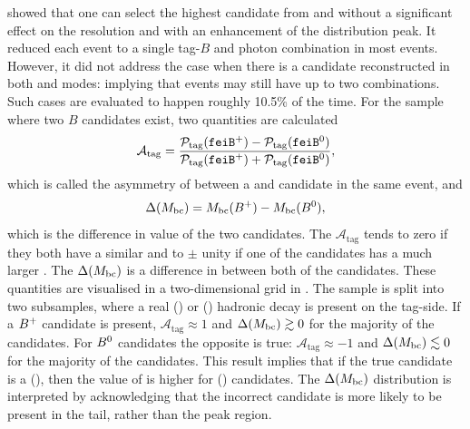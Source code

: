  showed that one can select the highest \feiProb candidate from \feiBp and \feiBz without a significant effect on the \EB resolution and with an enhancement of the \Mbc distribution peak.
It reduced each event to a single tag-$B$ and photon combination in most events.
However, it did not address the case when there is a candidate reconstructed in both \feiBp and \feiBz modes: implying that events may still have up to two combinations.
Such cases are evaluated to happen roughly 10.5\% of the time. 
For the sample where two $B$ candidates exist, two quantities are calculated
\begin{equation}\label{eq:asymmetry_tag}
    \mathcal{A}_{\mathrm{tag}} = \frac{\mathcal{P}_{\mathrm{tag}}({\texttt{feiB}^+}) - \mathcal{P}_{\mathrm{tag}}({\texttt{feiB}^0})}{\mathcal{P}_{\mathrm{tag}}({\texttt{feiB}^+}) + \mathcal{P}_{\mathrm{tag}}({\texttt{feiB}^0})},
\end{equation}
which is called the asymmetry of \feiProb between a \feiBp and \feiBz candidate in the same event, and
\begin{equation}\label{eq:delta_mbc}
    \Delta({M_{\mathrm{bc}}}) = {M_{\mathrm{bc}}}(B^+) - {M_{\mathrm{bc}}}(B^0),
\end{equation}
which is the difference in \Mbc value of the two candidates.
The $\mathcal{A}_{\mathrm{tag}}$ tends to zero if they both have a similar \feiProb and to $\pm$ unity if one of the candidates has a much larger \feiProb.
The $\Delta({M_{\mathrm{bc}}})$ is a difference in \Mbc between both of the candidates.
These quantities are visualised in a two-dimensional grid in .
The sample is split into two subsamples, where a real \Bp () or \Bz () hadronic decay is present on the tag-side.
If a $B^+$ candidate is present, $\mathcal{A}_{\mathrm{tag}}\approx1$ and $\Delta({M_{\mathrm{bc}}})\gtrsim 0$ for the majority of the candidates.
For $B^0$ candidates the opposite is true: $\mathcal{A}_{\mathrm{tag}}\approx-1$ and $\Delta({M_{\mathrm{bc}}})\lesssim 0$ for the majority of the candidates.
This result implies that if the true candidate is a \Bp(\Bz), then the value of \feiProb is higher for \feiBp (\feiBz) candidates.
The $\Delta({M_{\mathrm{bc}}})$ distribution is interpreted by acknowledging that the incorrect candidate is more likely to be present in the \Mbc tail, rather than the peak region.

